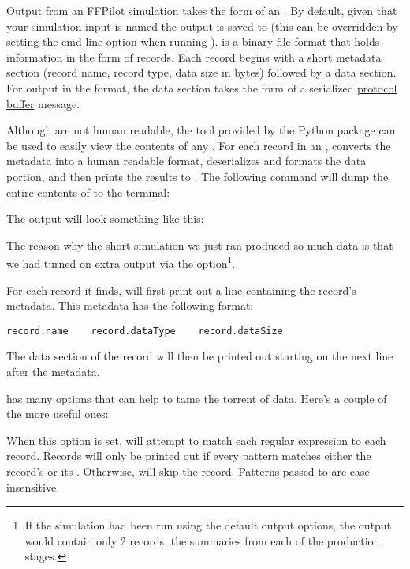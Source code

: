 {Output from an FFPilot simulation takes the form of an . By default, given that your simulation input is named  the output is saved to  (this can be overridden by setting the  cmd line option when running ).  is a binary file format that holds information in the form of records. Each record begins with a short metadata section (record name, record type, data size in bytes) followed by a data section. For  output in the  format, the data section takes the form of a serialized \href{https://developers.google.com/protocol-buffers/}{protocol buffer} message.

Although  are not human readable, the  tool provided by the  Python package can be used to easily view the contents of any . For each record in an ,  converts the metadata into a human readable format, deserializes and formats the data portion, and then prints the results to . The following command will dump the entire contents of \pth{\outpathrel} to the terminal:


The output will look something like this:


The reason why the short simulation we just ran produced so much data is that we had turned on extra output via the  option\footnote{If the simulation had been run using the default output options, the output would contain only 2 records, the summaries from each of the production stages.}. 

For each record it finds,  will first print out a line containing the record's metadata. This metadata has the following format:
\begin{verbatim}
record.name    record.dataType    record.dataSize
\end{verbatim}
The data section of the record will then be printed out starting on the next line after the metadata.

 has many options that can help to tame the torrent of data. Here's a couple of the more useful ones:
\begin{description}[style=nextline]
    \item[\code{-i/--include <pattern0> <pattern1> ...}]
        When this option is set,  will attempt to match each regular expression  to each record. Records will only be printed out if  every pattern matches either the record's  or its . Otherwise,  will skip the record. Patterns passed to  are case insensitive.
        

\end{description}}
